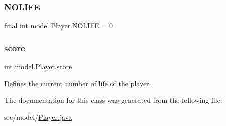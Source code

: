 \subsubsection{\texorpdfstring{N\+O\+L\+I\+FE}{NOLIFE}}
{\footnotesize\ttfamily final int model.\+Player.\+N\+O\+L\+I\+FE = 0\hspace{0.3cm}{\ttfamily [private]}}

\hypertarget{classmodel_1_1_player_ad6d852aea99befddd30bb094222123d2}{}\label{classmodel_1_1_player_ad6d852aea99befddd30bb094222123d2} 
\subsubsection{\texorpdfstring{score}{score}}
{\footnotesize\ttfamily int model.\+Player.\+score\hspace{0.3cm}{\ttfamily [private]}}

Defines the current number of life of the player. 

The documentation for this class was generated from the following file\+:\begin{DoxyCompactItemize}
\item 
src/model/\hyperlink{_player_8java}{Player.\+java}\end{DoxyCompactItemize}
